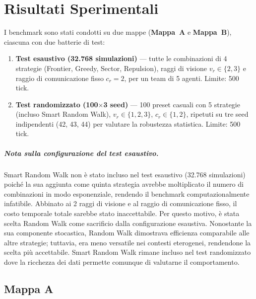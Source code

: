 \chapter{Risultati Sperimentali}
\label{ch:risultati}

I benchmark sono stati condotti su due mappe (\textbf{Mappa~A} e \textbf{Mappa~B}),
ciascuna con due batterie di test:

\begin{enumerate}
  \item \textbf{Test esaustivo (32.768 simulazioni)} --- tutte le combinazioni di 4 strategie
        (Frontier, Greedy, Sector, Repulsion), raggi di visione $v_r \in \{2,3\}$ e raggio di
        comunicazione fisso $c_r = 2$, per un team di 5 agenti. Limite: 500 tick.
  \item \textbf{Test randomizzato (100$\times$3 seed)} --- 100 preset casuali con 5 strategie
        (incluso Smart Random Walk), $v_r \in \{1,2,3\}$, $c_r \in \{1,2\}$, ripetuti su tre seed
        indipendenti (42, 43, 44) per valutare la robustezza statistica. Limite: 500 tick.
\end{enumerate}

\paragraph{Nota sulla configurazione del test esaustivo.}
Smart Random Walk non \`e stato incluso nel test esaustivo (32.768 simulazioni) poich\'e
la sua aggiunta come quinta strategia avrebbe moltiplicato il numero di combinazioni in modo
esponenziale, rendendo il benchmark computazionalmente infatibile. Abbinato ai 2 raggi di
visione e al raggio di comunicazione fisso, il costo temporale totale sarebbe stato inaccettabile.
Per questo motivo, \`e stata scelta Random Walk come sacrificio dalla configurazione esaustiva.
Nonostante la sua componente stocastica, Random Walk dimostrava efficienza comparabile alle altre
strategie; tuttavia, era meno versatile nei contesti eterogenei, rendendone la scelta pi\`u
accettabile. Smart Random Walk rimane incluso nel test randomizzato dove la ricchezza dei dati
permette comunque di valutarne il comportamento.

\section{Mappa A}

